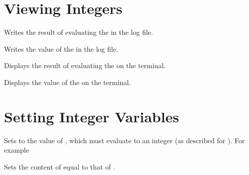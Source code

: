\documentclass[oneside]{book}
\begin{document}
\section{Viewing Integers}

\begin{function}{\intLog}
\begin{syntax}
 
\end{syntax}
Writes the result of evaluating the 
in the log file.
\end{function}

\begin{function}{\intVarLog}
\begin{syntax}
 
\end{syntax}
Writes the value of the  in the log file.
\end{function}

\begin{function}{\intShow}
\begin{syntax}
 
\end{syntax}
Displays the result of evaluating the 
on the terminal.
\end{function}

\begin{function}{\intVarShow}
\begin{syntax}
 
\end{syntax}
Displays the value of the  on the terminal.
\end{function}

\section{Setting Integer Variables}

\begin{function}{\intSet}
\begin{syntax}
  
\end{syntax}
Sets  to the value of ,
which must evaluate to an integer (as described for ).
For example
\begin{demohigh}
\intSet {}
\intUse \lTmpaInt
\end{demohigh}
\end{function}

\begin{function}{\intSetEq}
\begin{syntax}
  
\end{syntax}
Sets the content of  equal to that of
.
\end{function}
\end{document}
